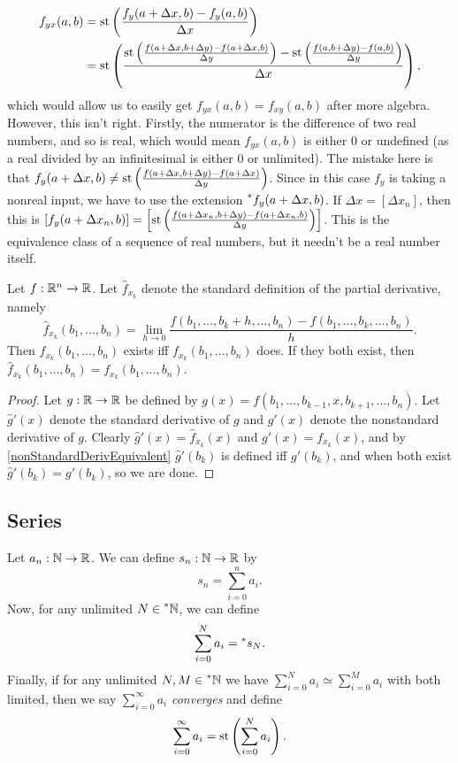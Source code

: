 \begin{align*}
    f_{yx}(a, b) &= \operatorname{st}\left(\frac{f_y(a + \Delta x, b) - f_y(a, b)}{\Delta x}\right) \\
        &= \operatorname{st}\left(\frac{\operatorname{st}\left(\frac{f(a + \Delta x, b + \Delta y) - f(a + \Delta x, b)}{\Delta y}\right) - \operatorname{st}\left(\frac{f(a, b + \Delta y) - f(a, b)}{\Delta y}\right)}{\Delta x}\right),
\end{align*}
which would allow us to easily get $f_{yx}(a, b)= f_{xy}(a, b)$ after more algebra. However, this isn't right. Firstly, the numerator is the difference of two real numbers, and so is real, which would mean $f_{yx}(a, b)$ is either $0$ or undefined (as a real divided by an infinitesimal is either $0$ or unlimited). The mistake here is that $f_y(a + \Delta x, b) \neq \operatorname{st}\left(\frac{f(a + \Delta x, b + \Delta y) - f(a + \Delta x)}{\Delta y}\right)$. Since in this case $f_y$ is taking a nonreal input, we have to use the extension $\prescript{*}{}{f_y}(a + \Delta x, b)$. If $\Delta x = [\Delta x_n]$, then this is $[f_y(a + \Delta x_n, b)] = \left[\operatorname{st}\left(\frac{f(a + \Delta x_n, b + \Delta y) - f(a + \Delta x_n, b)}{\Delta y}\right)\right]$. This is the equivalence class of a sequence of real numbers, but it needn't be a real number itself.

\begin{thm}
    Let $f: \mathbb{R}^n \to \mathbb{R}$. Let $\hat{f}_{x_k}$ denote the standard definition of the partial derivative, namely
    \[ \hat{f}_{x_k}(b_1, \ldots, b_n) = \lim_{h \to 0} \frac{f(b_1, \ldots, b_k + h, \ldots, b_n) - f(b_1, \ldots, b_k, \ldots, b_n)}{h} .\]
    Then $\hat{f}_{x_k}(b_1, \ldots, b_n)$ exists iff $f_{x_k}(b_1, \ldots, b_n)$ does. If they both exist, then $\hat{f}_{x_k}(b_1, \ldots, b_n) = f_{x_k}(b_1, \ldots, b_n)$.
\end{thm}

\begin{proof}
    Let $g: \mathbb{R} \to \mathbb{R}$ be defined by $g(x) = f(b_1, \ldots, b_{k-1}, x, b_{k+1}, \ldots, b_n)$. Let $\hat{g}'(x)$ denote the standard derivative of $g$ and $g'(x)$ denote the nonstandard derivative of $g$. Clearly $\hat{g}'(x) = \hat{f}_{x_k}(x)$ and $g'(x) = f_{x_k}(x)$, and by \autoref{nonStandardDerivEquivalent} $\hat{g}'(b_k)$ is defined iff $g'(b_k)$, and when both exist $\hat{g}'(b_k) = g'(b_k)$, so we are done.
\end{proof}

\subsection{Series}
Let $a_n: \mathbb{N} \to \mathbb{R}$. We can define $s_n: \mathbb{N} \to \mathbb{R}$ by 
\[ s_n = \sum_{i=0}^n a_i. \]
Now, for any unlimited $N \in \prescript{*}{}{\mathbb{N}}$, we can define
\[ \sum_{i=0}^N a_i = \prescript{*}{}{s_N}. \]
Finally, if for any unlimited $N, M \in \prescript{*}{}{\mathbb{N}}$ we have $\sum_{i=0}^N a_i \simeq \sum_{i=0}^M a_i$ with both limited, then we say $\sum_{i=0}^\infty a_i$ \textit{converges} and define
\[ \sum_{i=0}^\infty a_i = \operatorname{st}\left(\sum_{i=0}^N a_i\right). \] 

